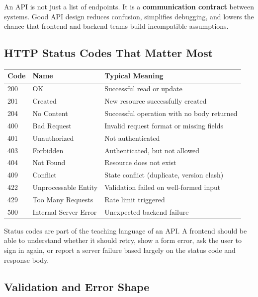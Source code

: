 \documentclass[12pt, a4paper, oneside]{book}
\begin{document}
An API is not just a list of endpoints. It is a \textbf{communication contract} between systems. Good API design reduces confusion, simplifies debugging, and lowers the chance that frontend and backend teams build incompatible assumptions.

\subsection{HTTP Status Codes That Matter Most}

\begin{center}
\begin{tabular}{l l l}
\toprule
\textbf{Code} & \textbf{Name} & \textbf{Typical Meaning} \\
\midrule
200 & OK & Successful read or update \\
201 & Created & New resource successfully created \\
204 & No Content & Successful operation with no body returned \\
400 & Bad Request & Invalid request format or missing fields \\
401 & Unauthorized & Not authenticated \\
403 & Forbidden & Authenticated, but not allowed \\
404 & Not Found & Resource does not exist \\
409 & Conflict & State conflict (duplicate, version clash) \\
422 & Unprocessable Entity & Validation failed on well-formed input \\
429 & Too Many Requests & Rate limit triggered \\
500 & Internal Server Error & Unexpected backend failure \\
\bottomrule
\end{tabular}
\end{center}

\begin{intuitionbox}
Status codes are part of the teaching language of an API. A frontend should be able to understand whether it should retry, show a form error, ask the user to sign in again, or report a server failure based largely on the status code and response body.
\end{intuitionbox}

\subsection{Validation and Error Shape}
\end{document}
